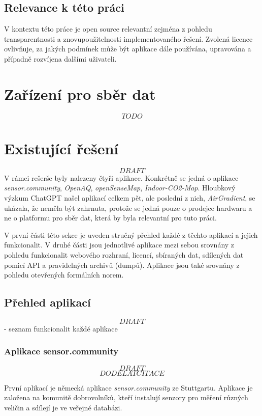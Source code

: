 \subsection{Relevance k této práci}
V kontextu této práce je open source relevantní zejména z pohledu transparentnosti a znovupoužitelnosti implementovaného řešení. Zvolená licence ovlivňuje, za jakých podmínek může být aplikace dále používána, upravována a případně rozvíjena dalšími uživateli.

\section{Zařízení pro sběr dat}
\[TODO\]

\section{Existující řešení}
\[DRAFT\]
V rámci rešerše byly nalezeny čtyři aplikace. Konkrétně se jedná o aplikace \textit{sensor.community}, \textit{OpenAQ}, \textit{openSenseMap}, \textit{Indoor-CO2-Map}. Hloubkový výzkum ChatGPT našel aplikací celkem pět, ale poslední z nich, \textit{AirGradient},  se ukázala, že neměla být zahrnuta, protože se jedná pouze o prodejce hardwaru a ne o platformu pro sběr dat, která by byla relevantní pro tuto práci.

V první části této sekce je uveden stručný přehled každé z těchto aplikací a jejich funkcionalit. 
V druhé části jsou jednotlivé aplikace mezi sebou srovnány z pohledu funkcionalit webového rozhraní, licencí, sbíraných dat, sdílených dat pomicí API a pravidelných archivů (dumpů). Aplikace jsou také srovnány z pohledu otevřených formálních norem.

\subsection{Přehled aplikací}

\[DRAFT\]
- seznam funkcionalit každé aplikace
\subsubsection{Aplikace sensor.community}

\[DRAFT\]
\[DODELAT CITACE\]

První aplikací je německá aplikace \textit{sensor.community} ze Stuttgartu. Aplikace je založena na komunitě dobrovolníků, kteří instalují senzory pro měření různých veličin a sdílejí je ve veřejné databázi. \parencite{SensorCommunityBuildYour}

